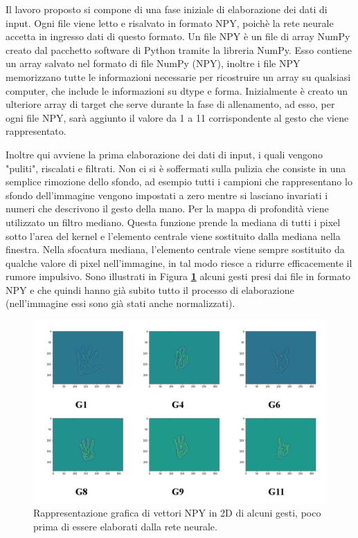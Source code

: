 Il lavoro proposto si compone di una fase iniziale di elaborazione dei dati di input. Ogni file viene letto e risalvato in formato NPY, poichè la rete neurale accetta in ingresso dati di questo formato. Un file NPY è un file di array NumPy creato dal pacchetto software di Python tramite la libreria NumPy. Esso contiene un array salvato nel formato di file NumPy (NPY), inoltre i file NPY memorizzano tutte le informazioni necessarie per ricostruire un array su qualsiasi computer, che include le informazioni su dtype e forma.
Inizialmente è creato un ulteriore array di target che serve durante la fase di allenamento, ad esso, per ogni file NPY, sarà aggiunto il valore da 1 a 11 corrispondente al gesto che viene rappresentato.

Inoltre qui avviene la prima elaborazione dei dati di input, i quali vengono "puliti", riscalati e filtrati. Non ci si è soffermati sulla pulizia che consiste in una semplice rimozione dello sfondo, ad esempio tutti i campioni che rappresentano lo sfondo dell'immagine vengono impostati a zero mentre si lasciano invariati i numeri che descrivono il gesto della mano.
Per la mappa di profondità viene utilizzato un filtro mediano. Questa funzione prende la mediana di tutti i pixel sotto l'area del kernel e l'elemento centrale viene sostituito dalla mediana nella finestra. Nella sfocatura mediana, l'elemento centrale viene sempre sostituito da qualche valore di pixel nell'immagine, in tal modo riesce a ridurre efficacemente il rumore impulsivo.
Sono illustrati in Figura \textbf{\ref{fig:vettorenpy}} alcuni gesti presi dai file in formato NPY e che quindi hanno già subito tutto il processo di elaborazione (nell'immagine essi sono già stati anche normalizzati).

\begin{figure}
\includegraphics[width=%
1\textwidth]{figures/GestiNpy}
\caption[Vettore NPY di alcuni gesti.]{Rappresentazione grafica di vettori NPY in 2D di alcuni gesti, poco prima di essere elaborati dalla rete neurale.
\label{fig:vettorenpy}}
\end{figure}

